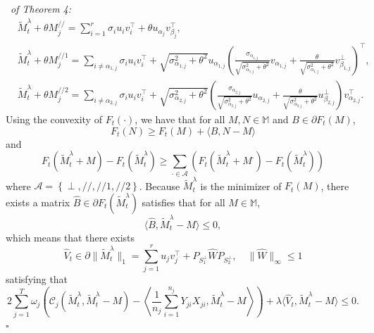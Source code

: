 \documentclass[12pt]{article}
\newenvironment{pf}{{\noindent\it Proof}\ }{\hfill $\square$\par}
\begin{document}
\begin{pf}{\it of Theorem 4:}
\begin{equation*}
\begin{aligned}
  & \widetilde{M}_t^\lambda+\theta M_j^{//} = \sum_{i=1}^r\sigma_i u_i v_i^\top + \theta u_{\alpha_j}v_{\beta_j}^\top,\\
  &  \widetilde{M}_t^\lambda+\theta M_j^{//1} = \sum_{i\not = \alpha_{1,j}}\sigma_i u_i v_i^\top + \sqrt{\sigma^2_{\alpha_{1,j}} + \theta^2}u_{\alpha_{1,j}}\left(\frac{\sigma_{\alpha_{1,j}}}{\sqrt{\sigma^2_{\alpha_{1,j}} + \theta^2}}v_{\alpha_{1,j}} +\frac{\theta}{\sqrt{\sigma^2_{\alpha_{1,j}} + \theta^2}}v^{\perp}_{\beta_{1,j}}\right)^\top ,\\
  &   \widetilde{M}_t^\lambda+\theta M_j^{//2} = \sum_{i\not = \alpha_{2,j}}\sigma_i u_i v_i^\top + \sqrt{\sigma^2_{\alpha_{2,j}} + \theta^2}\left(\frac{\sigma_{\alpha_{2,j}}}{\sqrt{\sigma^2_{\alpha_{2,j}} + \theta^2}}u_{\alpha_{2,j}} +\frac{\theta}{\sqrt{\sigma^2_{\alpha_{2,j}} + \theta^2}}u^{\perp}_{\beta_{2,j}}\right)v_{\alpha_{2,j}}^\top.
  \end{aligned}
  \end{equation*}
  Using the convexity of $F_t(\cdot)$, we have that for all $M,N\in \mathbb{M}$ and $B\in \partial F_t(M)$,
  \begin{equation}
  \label{convex_eq}
  F_t(N) \ge F_t(M)+ \langle B, N-M\rangle
  \end{equation}
  and
  \begin{equation}
  \label{decom_sum}
  F_t(\widetilde{M}_t^\lambda + M ) - F_t(\widetilde{M}_t^\lambda ) \ge  \sum_{\cdot \in \mathcal{A}}\left( F_t(\widetilde{M}_t^\lambda +  M^\cdot )- F_t(\widetilde{M}_t^\lambda )\right)
  \end{equation}
  where $\mathcal{A}=\left\{\perp,//,//1,//2\right\}$.
  Because $\widetilde{M}_t^\lambda$ is the minimizer of $F_t(M)$, there exists a matrix $\widehat{B} \in \partial F_t(\widetilde{M}_t^\lambda)$ satisfies that for all $M\in \mathbb{M}$,
  $$\langle \widehat{B}, \widetilde{M}_t^\lambda- M\rangle \le 0,$$
  which means that there exists 
  \begin{equation}
  \label{partial hat}
  \widehat{V}_t\in\partial \|\widetilde{M}_t^\lambda \|_1 = \sum_{j=1}^r u_j v_j^\top +P_{S_1^\perp}\widehat{W}P_{S_2^\perp},\quad \|\widehat{W}\|_{\infty}\le 1
  \end{equation}
  satisfying that
  \begin{equation}
  \label{mono_sub}
  2\sum_{j=1}^T \omega_j \left(\mathcal{C}_j( \widetilde{M}_t^\lambda, \widetilde{M}_t^\lambda-M) - \left\langle\frac{1}{n_j}\sum_{i=1}^{n_j}Y_{ji}X_{ji},\widetilde{M}_t^\lambda-M\right\rangle\right) +\lambda \langle \widehat{V}_t,\widetilde{M}_t^\lambda -M\rangle \le 0.

\end{equation}
\end{pf}
\end{document}
